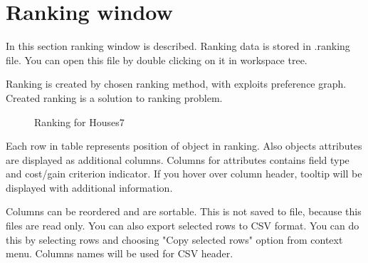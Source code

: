 \section{Ranking window}\label{section:ranking}

In this section ranking window is described. Ranking data is stored in .ranking file. You can open this file by double clicking on it in workspace tree.

Ranking is created by chosen ranking method, with exploits preference graph. Created ranking is a solution to ranking problem.

\begin{figure*}[!ht] 
	\centering
	\caption{Ranking for Houses7}
\end{figure*}

Each row in table represents position of object in ranking. Also objects attributes are displayed as additional columns. Columns for attributes contains field type and cost/gain criterion indicator. If you hover over column header, tooltip will be displayed with additional information.

Columns can be reordered and are sortable. This is not saved to file, because this files are read only. You can also export selected rows to CSV format. You can do this by selecting rows and choosing "Copy selected rows" option from context menu. Columns names will be used for CSV header.

\vfill\newpage